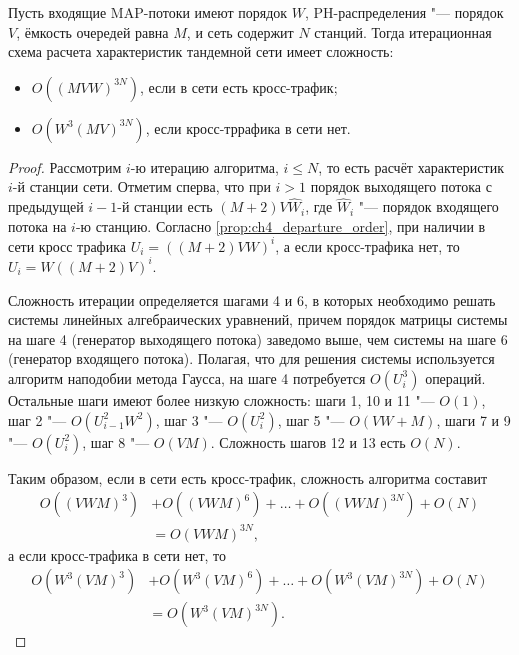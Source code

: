 \begin{prop}\label{prop:ch4_base_algorithm_complexity}
  Пусть входящие MAP-потоки имеют порядок $W$, PH-распределения "--- порядок $V$, ёмкость очередей равна $M$, и сеть содержит $N$ станций. Тогда итерационная схема расчета характеристик тандемной сети имеет сложность:
  \begin{itemize}
	  \item $O((M V W)^{3N})$, если в сети есть кросс-трафик;
	  \item $O(W^3 (M V)^{3N})$, если кросс-тррафика в сети нет.
  \end{itemize}
\end{prop}
\begin{proof}
Рассмотрим $i$-ю итерацию алгоритма, $i \leqslant N$, то есть расчёт характеристик $i$-й станции сети. Отметим сперва, что при $i > 1$ порядок выходящего потока с предыдущей $i-1$-й станции есть $(M + 2) V \hat{W}_i$, где $\hat{W}_i$ "--- порядок входящего потока на $i$-ю станцию. Согласно \ref{prop:ch4_departure_order}, при наличии в сети кросс трафика $U_i = ((M+2)VW)^i$, а если кросс-трафика нет, то $U_i = W((M+2)V)^i$.

Сложность итерации определяется шагами 4 и 6, в которых необходимо решать системы линейных алгебраических уравнений, причем порядок матрицы системы на шаге 4 (генератор выходящего потока) заведомо выше, чем системы на шаге 6 (генератор входящего потока). Полагая, что для решения системы используется алгоритм наподобии метода Гаусса, на шаге 4 потребуется $O(U_i^3)$ операций. Остальные шаги имеют более низкую сложность: шаги 1, 10 и 11 "--- $O(1)$, шаг 2 "--- $O(U_{i-1}^2 W^2)$, шаг 3 "--- $O(U_i^2)$, шаг 5 "--- $O(VW + M)$, шаги 7 и 9 "--- $O(U_i^2)$, шаг 8 "--- $O(VM)$. Сложность шагов 12 и 13 есть $O(N)$.

Таким образом, если в сети есть кросс-трафик, сложность алгоритма составит
$$
  \begin{aligned}
    O((VWM)^3) &+ O((VWM)^6) + \dots + O((VWM)^{3N}) + O(N) \\
    &= O(VWM)^{3N},
  \end{aligned}
$$
а если кросс-трафика в сети нет, то
$$
  \begin{aligned}
    O(W^3 (VM)^3) &+ O(W^3 (VM)^6) + \dots + O(W^3 (VM)^{3N}) + O(N) \\
    &= O(W^3 (VM)^{3N}).
  \end{aligned}
$$

\end{proof}

